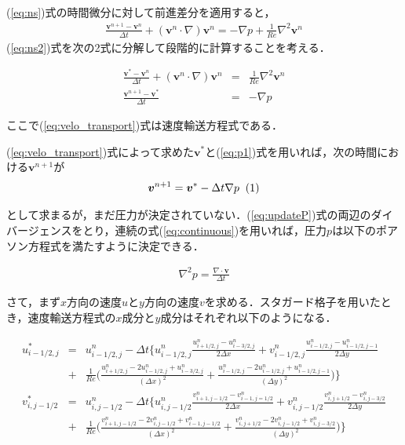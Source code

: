 \documentclass[twocolumn,oneside,a4paper]{article}
\newcommand\inlineeqno{\stepcounter{equation}\ (\theequation)}
\begin{document}
(\ref{eq:ns})式の時間微分に対して前進差分を適用すると，
\begin{eqnarray}\label{eq:ns2}
     \frac{\bm{v}^{n+1}-\bm{v}^n}{\Delta t} + (\bm{v}^n \cdot \nabla )\bm{v}^n = - \nabla p + \frac{1}{Re} \nabla^2 \bm{v}^n
\end{eqnarray}
(\ref{eq:ns2})式を次の2式に分解して段階的に計算することを考える．

\begin{eqnarray}
     \frac{\bm{v}^{\ast}-\bm{v}^n}{\Delta t} + (\bm{v}^n \cdot \nabla )\bm{v}^n &=& \frac{1}{Re} \nabla^2 \bm{v}^n \label{eq:velo_transport}\\
     \frac{\bm{v}^{n+1}-\bm{v}^{\ast}}{\Delta t} &=& - \nabla p     \label{eq:p1}
\end{eqnarray}

ここで(\ref{eq:velo_transport})式は速度輸送方程式である．

(\ref{eq:velo_transport})式によって求めた$\bm{v}^\ast$と(\ref{eq:p1})式を用いれば，次の時間における$\bm{v}^{n+1}$が
\begin{eqnarray}
\bm{v}^{n+1}=\bm{v}^{\ast}-\Delta t \nabla p \: \inlineeqno \label{eq:updateP}    
\end{eqnarray}

として求まるが，まだ圧力が決定されていない．(\ref{eq:updateP})式の両辺のダイバージェンスをとり，連続の式(\ref{eq:continuous})を用いれば，圧力$p$は以下のポアソン方程式を満たすように決定できる．

\begin{eqnarray}\label{eq:poisson}
     \nabla^2 p = \frac{\nabla \cdot \bm{v}}{\Delta t}
\end{eqnarray}


さて，まず$x$方向の速度$u$と$y$方向の速度$v$を求める．スタガード格子を用いたとき，速度輸送方程式の$x$成分と$y$成分はそれぞれ以下のようになる．

\begin{strip}
\begin{eqnarray}         
     u^\ast_{i-1/2,j} &=& u^n_{i-1/2,j} - \Delta t \Bigg \{u^n_{i-1/2,j}\frac{u^n_{i+1/2,j}-u^n_{i-3/2,j}}{2\Delta x}+ v^n_{i-1/2,j}\frac{u^n_{i-1/2,j}-u^n_{i-1/2,j-1}}{2\Delta y} \nonumber \\
     &+& \frac{1}{Re}\Bigg( \frac{u^n_{i+1/2,j}-2u^n_{i-1/2,j}+u^n_{i-3/2,j}}{(\Delta x)^2}+\frac{u^n_{i-1/2,j}-2u^n_{i-1/2,j}+u^n_{i-1/2,j-1}}{(\Delta y)^2} \Bigg) \Bigg\} \\
     v^\ast_{i,j-1/2} &=& u^n_{i,j-1/2} - \Delta t \Bigg \{u^n_{i,j-1/2}\frac{v^n_{i+1,j-1/2}-v^n_{i-1,j=1/2}}{2\Delta x}+ v^n_{i,j-1/2}\frac{v^n_{i,j+1/2}-v^n_{i,j-3/2}}{2\Delta y} \nonumber \\
     &+& \frac{1}{Re}\Bigg( \frac{v^n_{i+1,j-1/2}-2v^n_{i,j-1/2}+v^n_{i-1,j-1/2}}{(\Delta x)^2}+\frac{v^n_{i,j+1/2}-2v^n_{i,j-1/2}+v^n_{i,j-3/2}}{(\Delta y)^2} \Bigg) \Bigg\}
\end{eqnarray}
\end{strip}
\end{document}
